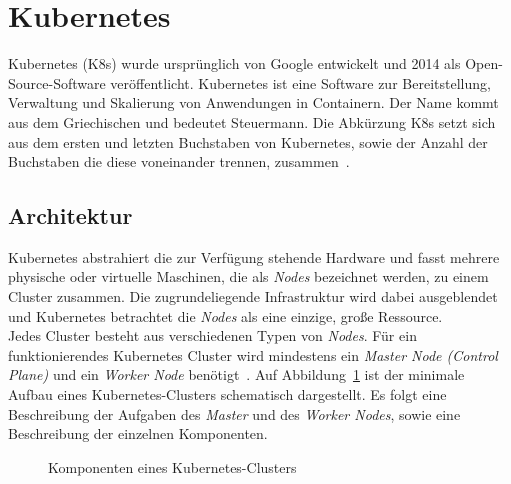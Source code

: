 \section{Kubernetes}\label{sec:kubernetes}

Kubernetes (K8s) wurde ursprünglich von Google entwickelt und 2014 als Open-Source-Software veröffentlicht.
Kubernetes ist eine Software zur Bereitstellung, Verwaltung und Skalierung von Anwendungen in Containern. Der Name kommt aus dem Griechischen und bedeutet Steuermann.
Die Abkürzung K8s setzt sich aus dem ersten und letzten Buchstaben von Kubernetes, sowie der Anzahl der Buchstaben die diese voneinander trennen, zusammen~\cite{kubernetes-google-cloud}.

\subsection{Architektur}

Kubernetes abstrahiert die zur Verfügung stehende Hardware und fasst mehrere physische oder virtuelle Maschinen,
die als \textit{Nodes} bezeichnet werden, zu einem Cluster zusammen.
Die zugrundeliegende Infrastruktur wird dabei ausgeblendet und Kubernetes betrachtet die \textit{Nodes} als eine einzige, große Ressource.
\\
Jedes Cluster besteht aus verschiedenen Typen von \textit{Nodes}.
Für ein funktionierendes Kubernetes Cluster wird mindestens ein \textit{Master Node (Control Plane)} und ein \textit{Worker Node} benötigt~\cite{kubernetes-in-action-introduction}.
Auf Abbildung~\ref{fig:kubernetes-architecture} ist der minimale Aufbau eines Kubernetes-Clusters schematisch dargestellt. Es folgt eine
Beschreibung der Aufgaben des \textit{Master} und des \textit{Worker Nodes}, sowie eine Beschreibung der einzelnen Komponenten.

\begin{figure}[htp] %
      \centering
      \caption{Komponenten eines Kubernetes-Clusters}
      \label{fig:kubernetes-architecture}
\end{figure}


